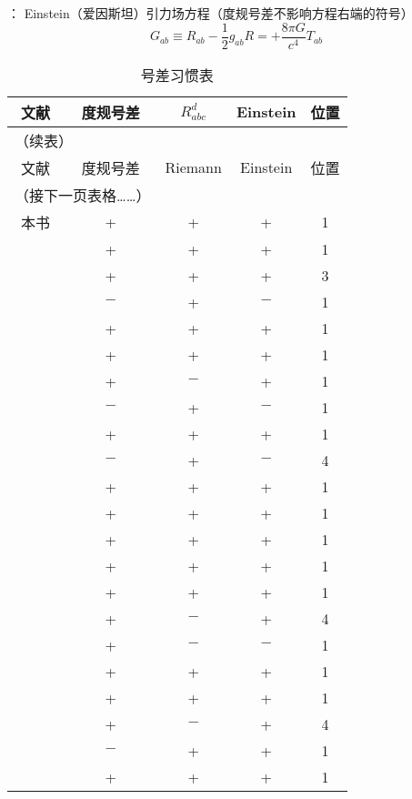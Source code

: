 ：
Einstein（爱因斯坦）引力场方程（度规号差不影响方程右端的符号）
\begin{equation*}
    G_{ab} \equiv  R_{ab} - \frac{1}{2}g_{ab} R  = +\frac{8\pi G}{c^4} T_{ab}
\end{equation*}






\newpage
\begin{longtable}{|*5{c|}}
    \caption{号差习惯表}\label{sign-convention} \\ \hline 
    文献 & 度规号差   &   $R^{d}_{abc}$   &  Einstein   &    位置   \\ \hline
    \endfirsthead
    \multicolumn{2}{l}{（续表）} \\ \hline
    文献 & 度规号差   &   Riemann   &  Einstein   &    位置   \\ \hline
    \endhead \hline
    \multicolumn{2}{c}{（接下一页表格……）} \\[2ex]
    \endfoot
    \hline
    \endlastfoot
    本书 & + & + & + &  1  \\ \hline
    \textcite{carroll-stg2019} & + & + & + &  1  \\
    \textcite{Choquet-Bruhat-2009} & + & + & + &  3  \\
    \textcite{dirac-rela-1975} & $-$ & + & $-$ &  1  \\
    \textcite{hawking-ellis1973} & + & + & + &  1  \\
    \textcite{mtw1973} & + & + & + &  1  \\
    \textcite{oneill1983} & + & $-$ & + &  1  \\
    \textcite{ohanian-ruffini-2013} & $-$ & + & $-$ &  1  \\
    \textcite{padmanabhan2010}  & + & + & + &  1  \\
    \textcite{penrose-Rindler1984} & $-$ & + & $-$ &  4  \\
    \textcite{poisson-will-2014} & + & + & + &  1  \\
    \textcite{sachs-wu-1977} & + & + & + &  1  \\
    \textcite{schutz-2022} & + & + & + &  1  \\
    \textcite{stephani-exe-2003} & + & + & + &  1  \\
    \textcite{straumann2013} & + & + & + &  1  \\
    \textcite{wald1984} & + & $-$ & + &  4  \\
    \textcite{weinberg_grav-1972}  & + & $-$ & $-$ &  1  \\
    \textcite{will_tegp-2018}  & + & + & + &  1  \\
    \textcite{chenbin2018} & + & + & + &  1  \\
    \textcite{liang_zhou2006_1} & + & $-$ & + &  4  \\
    \textcite{wangyj-2011}  & $-$ & + & + &  1  \\
    \textcite{xu-wu-1999}  & + & + & + &  1  \\
    \hline
\end{longtable}


